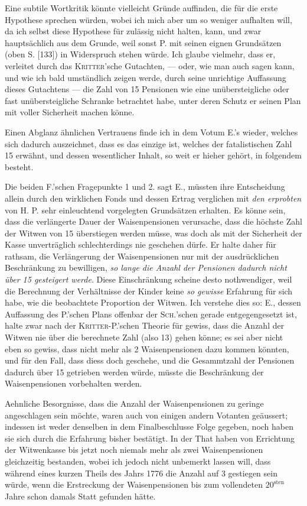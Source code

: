\par{}
Eine subtile Wortkritik könnte vielleicht Gründe auffinden, die für die erste Hypothese sprechen würden, wobei ich mich aber um so weniger aufhalten will, da ich selbst diese Hypothese für zulässig nicht halten, kann, und zwar hauptsächlich aus dem Grunde, weil sonst P. mit seinen eignen Grundsätzen (oben S. [133]) in Widerspruch stehen würde. Ich glaube vielmehr, dass er, verleitet durch das \textsc{Kritter}’sche Gutachten, — oder, wie man auch sagen kann, und wie ich bald umständlich zeigen werde, durch seine unrichtige Auffassung dieses Gutachtens — die Zahl von 15 Pensionen wie eine unübersteigliche oder fast unübersteigliche Schranke betrachtet habe, unter deren Schutz er seinen Plan mit voller Sicherheit machen könne.

Einen Abglanz ähnlichen Vertrauens finde ich in dem Votum E.’s wieder, welches sich dadurch auszeichnet, dass es das einzige ist, welches der fatalistischen Zahl 15 erwähnt, und dessen wesentlicher Inhalt, so weit er hieher gehört, in folgendem besteht.

Die beiden F.’schen Fragepunkte 1 und 2. sagt E., müssten ihre Entscheidung allein durch den wirklichen Fonds und dessen Ertrag verglichen mit \textit{den erprobten} von H. P. sehr einleuchtend vorgelegten Grundsätzen erhalten. Es könne sein, dass die verlängerte Dauer der Waisenpensionen verursache, dass die höchste Zahl der Witwen von 15 überstiegen werden müsse, was doch als mit der Sicherheit der Kasse unverträglich schlechterdings nie geschehen dürfe. Er halte daher für rathsam, die Verlängerung der Waisenpensionen nur mit der ausdrücklichen Beschränkung zu bewilligen, \textit{so lange die Anzahl der Pensionen dadurch nicht über 15 gesteigert werde}. Diese Einschränkung scheine desto nothwendiger, weil die Berechnung der Verhältnisse der Kinder keine \textit{so gewisse} Erfahrung für sich habe, wie die beobachtete Proportion der Witwen. Ich verstehe dies so: E., dessen Auffassung des P.’schen Plans offenbar der \textsc{Sch.}’schen gerade entgegengesetzt ist, halte zwar nach der \textsc{Kritter}-P.’schen Theorie für gewiss, dass die Anzahl der Witwen nie über die berechnete Zahl (also 13) gehen könne; es sei aber nicht eben so gewiss, dass nicht mehr als 2 Waisenpensionen dazu kommen könnten, und für den Fall, dass diess doch geschehe, und die Gesammtzahl der Pensionen dadurch über 15 getrieben werden würde, müsste die Beschränkung der Waisenpensionen vorbehalten werden.

Aehnliche Besorgnisse, dass die Anzahl der Waisenpensionen zu geringe angeschlagen sein möchte, waren auch von einigen andern Votanten geäussert; indessen ist weder denselben in dem Finalbeschlusse Folge gegeben, noch haben sie sich durch die Erfahrung bisher bestätigt. In der That haben von Errichtung der Witwenkasse bis jetzt noch niemals mehr als zwei Waisenpensionen gleichzeitig bestanden, wobei ich jedoch nicht unbemerkt lassen will, dass während eines kurzen Theils des Jahrs 1776 die Anzahl auf 3 gestiegen sein würde, wenn die Erstreckung der Waisenpensionen bis zum vollendeten \(20^{\text{sten}}\) Jahre schon damals Statt gefunden hätte.

